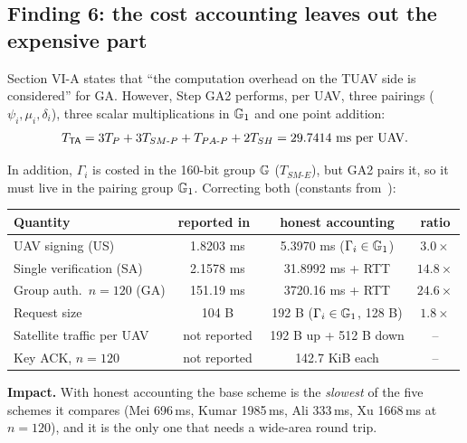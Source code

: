 \subsection{Finding 6: the cost accounting leaves out the expensive part}\label{sec:f6}
\begin{flawbox}[title={The reported 151\,ms excludes the TA's pairings (and the satellite delay)}]
\begin{finding}\label{f:cost}
Section VI-A states that ``the computation overhead on the TUAV side is considered'' for GA. However, Step GA2 performs, per UAV, three pairings
($\psi_i,\mu_i,\delta_i$), three scalar multiplications in $\mathbb{G}_1$ and one point addition:
\[ T_{\TA}=3T_P+3T_{SM\text{-}P}+T_{PA\text{-}P}+2T_{SH}=29.7414\ \text{ms per UAV.} \]
\end{finding}
In addition, $\Gamma_i$ is costed in the 160-bit group $\mathbb{G}$ ($T_{SM\text{-}E}$), but GA2 pairs it, so it must live in the pairing group $\mathbb{G}_1$.
Correcting both (constants from~\cite{base}):
\begin{center}\small
\begin{tabular}{@{}lccc@{}}
\toprule
Quantity & reported in~\cite{base} & honest accounting & ratio\\
\midrule
UAV signing (US) & 1.8203 ms & 5.3970 ms ($\Gamma_i\in\mathbb{G}_1$) & $3.0\times$\\
Single verification (SA) & 2.1578 ms & 31.8992 ms + RTT & $14.8\times$\\
Group auth.\ $n{=}120$ (GA) & 151.19 ms & 3720.16 ms + RTT & $24.6\times$\\
Request size & 104 B & 192 B ($\Gamma_i\in\mathbb{G}_1$, 128 B) & $1.8\times$\\
Satellite traffic per UAV & not reported & 192 B up + 512 B down & --\\
Key ACK, $n{=}120$ & not reported & 142.7 KiB each & --\\
\bottomrule
\end{tabular}
\end{center}
\textbf{Impact.} With honest accounting the base scheme is the \emph{slowest} of the five schemes it compares (Mei 696\,ms, Kumar 1985\,ms, Ali 333\,ms,
Xu 1668\,ms at $n{=}120$), and it is the only one that needs a wide-area round trip.
\end{flawbox}

